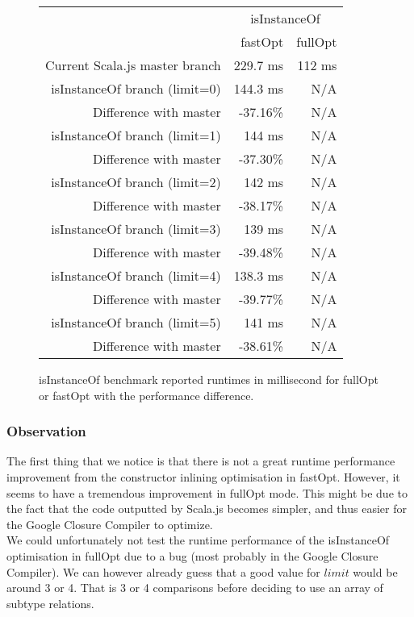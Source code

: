 \begin{figure}[H]
  \centering
  \begin{tabular}{ | r | r | r | }\hline
    & \multicolumn{2}{|c|}{isInstanceOf} \\
    & fastOpt & fullOpt \\ \hline
    Current Scala.js master branch & 229.7 ms & 112 ms \\
\hline \hline	
    isInstanceOf branch (limit=0)& 144.3 ms & N/A\\ \hline
    Difference with master & -37.16\% & N/A\\ \hline
\hline
    isInstanceOf branch (limit=1)& 144 ms & N/A\\ \hline
    Difference with master & -37.30\% & N/A\\ \hline
\hline
    isInstanceOf branch (limit=2)& 142 ms & N/A\\ \hline
    Difference with master & -38.17\% & N/A\\ \hline
\hline
    isInstanceOf branch (limit=3)& 139 ms & N/A\\ \hline
    Difference with master & -39.48\% & N/A\\ \hline
\hline
    isInstanceOf branch (limit=4)& 138.3 ms & N/A\\ \hline
    Difference with master & -39.77\% & N/A\\ \hline
\hline
    isInstanceOf branch (limit=5)& 141 ms & N/A\\ \hline
    Difference with master & -38.61\% & N/A\\ \hline
     \end{tabular}
  \captionsetup{justification=centering}
  \caption{isInstanceOf benchmark reported runtimes in millisecond for fullOpt
or fastOpt with the performance difference.}
  \label{fig:run_times_instanceof}
\end{figure}

 
\subsubsection{Observation}
The first thing that we notice is that there is not a great runtime performance
improvement from the constructor inlining optimisation in fastOpt. However, it
seems to have a tremendous improvement in fullOpt mode. This might be due to
the fact that the code outputted by Scala.js becomes simpler, and thus easier
for the Google Closure Compiler to optimize.\\
We could unfortunately not test the runtime performance of the isInstanceOf
optimisation in fullOpt due to a bug (most probably in the Google Closure
Compiler). We can however already guess that a good value for $limit$ would be
around 3 or 4. That is 3 or 4 comparisons before deciding to use an array of
subtype relations.